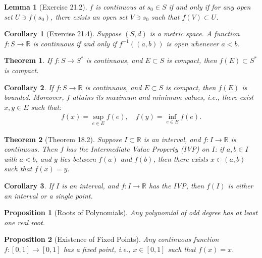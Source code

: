 \documentclass[7pt]{article}
\theoremstyle{definition}
\theoremstyle{plain}
\newtheorem{theorem}{Theorem}
\newtheorem{proposition}{Proposition}
\newtheorem{corollary}{Corollary}
\newtheorem{lemma}{Lemma}
\begin{document}
\begin{lemma}[Exercise 21.2]
$ f $ is continuous at $ s_0 \in S $ if and only if for any open set $ U \ni f(s_0) $, there exists an open set $ V \ni s_0 $ such that $ f(V) \subset U $.
\end{lemma}

\begin{corollary}[Exercise 21.4]
Suppose $ (S, d) $ is a metric space. A function $ f : S \to \mathbb{R} $ is continuous if and only if $ f^{-1}((a, b)) $ is open whenever $ a < b $.
\end{corollary}

\begin{theorem}
If $ f : S \to S^* $ is continuous, and $ E \subset S $ is compact, then $ f(E) \subset S^* $ is compact.
\end{theorem}

\begin{corollary}
If $ f : S \to \mathbb{R} $ is continuous, and $ E \subset S $ is compact, then $ f(E) $ is bounded. Moreover, $ f $ attains its maximum and minimum values, i.e., there exist $ x, y \in E $ such that:
\begin{align}
f(x) = \sup_{e \in E} f(e), \quad f(y) = \inf_{e \in E} f(e).
\end{align}
\end{corollary}

\begin{theorem}[Theorem 18.2]
Suppose $ I \subset \mathbb{R} $ is an interval, and $ f : I \to \mathbb{R} $ is continuous. Then $ f $ has the Intermediate Value Property (IVP) on $ I $: if $ a, b \in I $ with $ a < b $, and $ y $ lies between $ f(a) $ and $ f(b) $, then there exists $ x \in (a, b) $ such that $ f(x) = y $.
\end{theorem}

\begin{corollary}
If $ I $ is an interval, and $ f : I \to \mathbb{R} $ has the IVP, then $ f(I) $ is either an interval or a single point.
\end{corollary}

\begin{proposition}[Roots of Polynomials]
Any polynomial of odd degree has at least one real root.
\end{proposition}

\begin{proposition}[Existence of Fixed Points]
Any continuous function $ f : [0, 1] \to [0, 1] $ has a fixed point, i.e., $ x \in [0, 1] $ such that $ f(x) = x $.
\end{proposition}
\end{document}
